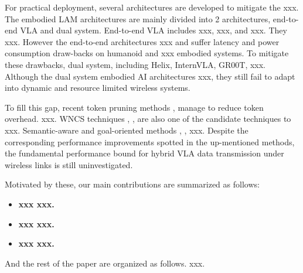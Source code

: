 \documentclass[lettersize,journal]{IEEEtran}
\theoremstyle{custom}
\begin{document}
For practical deployment, several architectures are developed to mitigate the xxx. The embodied LAM architectures are mainly divided into 2 architectures, end-to-end VLA and dual system. End-to-end VLA includes xxx, xxx, and xxx. They xxx. However the end-to-end architectures xxx and suffer latency and power consumption draw-backs on humanoid and xxx embodied systems. To mitigate these drawbacks, dual system, including Helix, InternVLA, GR00T, xxx. Although the dual system embodied AI architectures xxx, they still fail to adapt into dynamic and resource limited wireless systems. 

To fill this gap, recent token pruning methods \cite{}, \cite{} manage to reduce token overhead. xxx. WNCS techniques \cite{}, \cite{}, \cite{} are also one of the candidate techniques to xxx. Semantic-aware and goal-oriented methods \cite{}, \cite{}, \cite{} xxx. Despite the corresponding performance improvements spotted in the up-mentioned methods, the fundamental performance bound for hybrid VLA data transmission under wireless links is still uninvestigated. 

Motivated by these, our main contributions are summarized as follows: 
\begin{itemize}
    \item \bf{xxx} xxx. 
    \item \bf{xxx} xxx. 
    \item \bf{xxx} xxx. 
\end{itemize}

And the rest of the paper are organized as follows. xxx. 
\end{document}
